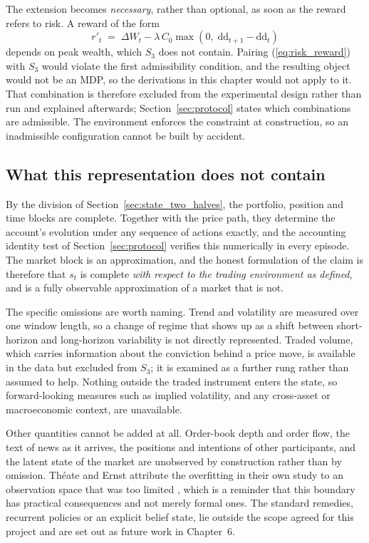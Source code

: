 The extension becomes \emph{necessary}, rather than optional, as soon as
the reward refers to risk. A reward of the form
\begin{equation}
r'_t \;=\; \Delta W_t - \lambda\,C_0 \max\!\left(0,\; \mathrm{dd}_{t+1} - \mathrm{dd}_t\right)
\label{eq:risk_reward}
\end{equation}
depends on peak wealth, which $S_3$ does not contain. Pairing
(\ref{eq:risk_reward}) with $S_3$ would violate the first admissibility
condition, and the resulting object would not be an MDP, so the
derivations in this chapter would not apply to it. That combination is
therefore excluded from the experimental design rather than run and
explained afterwards; Section~\ref{sec:protocol} states which
combinations are admissible. The environment enforces the constraint at
construction, so an inadmissible configuration cannot be built by
accident.

\subsection{What this representation does not contain}
\label{sec:state_limits}

By the division of Section~\ref{sec:state_two_halves}, the portfolio,
position and time blocks are complete. Together with the price path, they
determine the account's evolution under any sequence of actions exactly,
and the accounting identity test of Section~\ref{sec:protocol} verifies
this numerically in every episode. The market block is an approximation,
and the honest formulation of the claim is therefore that $s_t$ is
complete \emph{with respect to the trading environment as defined}, and
is a fully observable approximation of a market that is not.

The specific omissions are worth naming. Trend and volatility are
measured over one window length, so a change of regime that shows up as a
shift between short-horizon and long-horizon variability is not directly
represented. Traded volume, which carries information about the conviction
behind a price move, is available in the data but excluded from $S_3$; it
is examined as a further rung rather than assumed to help. Nothing outside
the traded instrument enters the state, so forward-looking measures such
as implied volatility, and any cross-asset or macroeconomic context, are
unavailable.

Other quantities cannot be added at all. Order-book depth and order flow,
the text of news as it arrives, the positions and intentions of other
participants, and the latent state of the market are unobserved by
construction rather than by omission. Th\'eate and Ernst attribute the
overfitting in their own study to an observation space that was too
limited \cite{theate2021}, which is a reminder that this boundary has
practical consequences and not merely formal ones. The standard remedies,
recurrent policies or an explicit belief state, lie outside the scope
agreed for this project and are set out as future work in Chapter~6.

